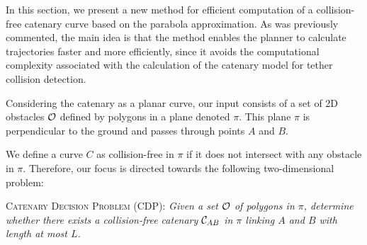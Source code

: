 




In this section, we present a new method for efficient computation of a collision-free catenary curve based on the parabola approximation. As was previously commented, the main idea is that the method enables the planner to calculate trajectories faster and more efficiently, since it avoids the computational complexity associated with the calculation of the catenary model for tether collision detection.

Considering the catenary as a planar curve, our input consists of a set of 2D obstacles $\cal{O}$ defined by polygons in a plane denoted $\pi$. This plane $\pi$ is perpendicular to the ground and passes through points $A$ and $B$. 





We define a curve $C$ as collision-free in $\pi$ if it does not intersect with any obstacle in $\pi$.  Therefore, our focus is directed towards the following two-dimensional problem:


\vspace{.25cm}
\textsc{Catenary Decision Problem (CDP):} \emph{Given a set $\cal O$ of polygons in $\pi$, determine whether there exists a collision-free catenary 
${\cal C}_{AB}$ in $\pi$ linking $A$ and $B$ with length at most $L$.} 

